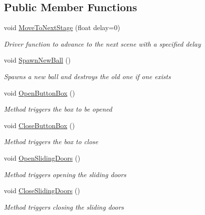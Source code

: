 \subsection*{Public Member Functions}
\begin{DoxyCompactItemize}
\item 
void \mbox{\hyperlink{class_intro_session_manager_a9541e181250bbfbfa2d16f62ccb64a22}{Move\+To\+Next\+Stage}} (float delay=0)
\begin{DoxyCompactList}\small\item\em Driver function to advance to the next scene with a specified delay \end{DoxyCompactList}\item 
void \mbox{\hyperlink{class_intro_session_manager_ab234b0587ea8c4283121ac8103ef67e1}{Spawn\+New\+Ball}} ()
\begin{DoxyCompactList}\small\item\em Spawns a new ball and destroys the old one if one exists \end{DoxyCompactList}\item 
void \mbox{\hyperlink{class_intro_session_manager_a0998c6878046777a1baecb46ff8859ec}{Open\+Button\+Box}} ()
\begin{DoxyCompactList}\small\item\em Method triggers the box to be opened \end{DoxyCompactList}\item 
void \mbox{\hyperlink{class_intro_session_manager_ac76f64b1d5b9e0a1a31b2f082708513b}{Close\+Button\+Box}} ()
\begin{DoxyCompactList}\small\item\em Method triggers the box to close \end{DoxyCompactList}\item 
void \mbox{\hyperlink{class_intro_session_manager_ab0c0444fb1525d86b4187c32cec0ce42}{Open\+Sliding\+Doors}} ()
\begin{DoxyCompactList}\small\item\em Method triggers opening the sliding doors \end{DoxyCompactList}\item 
void \mbox{\hyperlink{class_intro_session_manager_ad19be66a5259ad1075f5bec8389bb2ed}{Close\+Sliding\+Doors}} ()
\begin{DoxyCompactList}\small\item\em Method triggers closing the sliding doors \end{DoxyCompactList}\item 

\end{DoxyCompactItemize}
